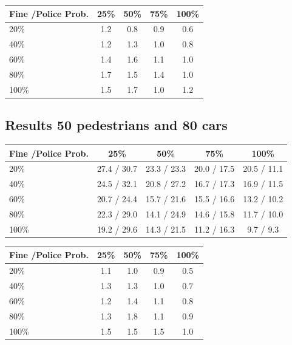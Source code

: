 \documentclass[a4paper]{article}
\begin{document}
\begin{table}[H]
\centering
\begin{tabular}{ l | c c c c }
  Fine \slash Police Prob. & 25\% & 50\% & 75\% & 100\% \\ 
  \hline
  20\%  & 1.2 & 0.8 & 0.9 & 0.6  \\
  40\%  & 1.2 & 1.3 & 1.0 & 0.8  \\
  60\%  & 1.4 & 1.6 & 1.1 & 1.0  \\
  80\%  & 1.7 & 1.5 & 1.4 & 1.0  \\
  100\% & 1.5 & 1.7 & 1.0 & 1.2  \\
\end{tabular}
\end{table}

\subsection{Results 50 pedestrians and 80 cars}
\begin{table}[H]
\centering
\begin{tabular}{ l | c c c c }
  Fine \slash Police Prob. & 25\% & 50\% & 75\% & 100\% \\ 
  \hline
  20\%  & 27.4 / 30.7 & 23.3 / 23.3 & 20.0 / 17.5 & 20.5 / 11.1  \\
  40\%  & 24.5 / 32.1 & 20.8 / 27.2 & 16.7 / 17.3 & 16.9 / 11.5  \\
  60\%  & 20.7 / 24.4 & 15.7 / 21.6 & 15.5 / 16.6 & 13.2 / 10.2  \\
  80\%  & 22.3 / 29.0 & 14.1 / 24.9 & 14.6 / 15.8 & 11.7 / 10.0  \\
  100\% & 19.2 / 29.6 & 14.3 / 21.5 & 11.2 / 16.3 &  9.7 /  9.3  \\
\end{tabular}
\end{table}

\begin{table}[H]
\centering
\begin{tabular}{ l | c c c c }
  Fine \slash Police Prob. & 25\% & 50\% & 75\% & 100\% \\ 
  \hline
  20\%  & 1.1 & 1.0 & 0.9 & 0.5  \\
  40\%  & 1.3 & 1.3 & 1.0 & 0.7  \\
  60\%  & 1.2 & 1.4 & 1.1 & 0.8  \\
  80\%  & 1.3 & 1.8 & 1.1 & 0.9  \\
  100\% & 1.5 & 1.5 & 1.5 & 1.0  \\
\end{tabular}
\end{table}
\end{document}
